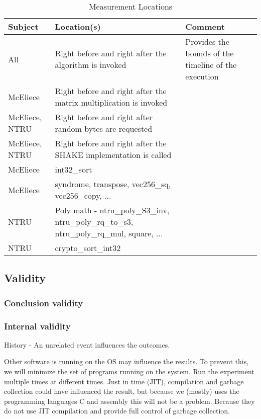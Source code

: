 \begin{table}[H]
    \centering
    \begin{tabular}{l|p{3cm}|p{3cm}}
        Subject & Location(s) & Comment \\
        \hline
        All & Right before and right after the algorithm is invoked & Provides the bounds of the timeline of the execution \\
        McEliece & Right before and right after the matrix multiplication is invoked & \\
        McEliece, NTRU & Right before and right after random bytes are requested & \\
        McEliece, NTRU & Right before and right after the SHAKE implementation is called & \\
        McEliece & int32_sort & \\
        McEliece & syndrome, transpose, vec256_sq, vec256_copy, ... &\\
        NTRU & Poly math - ntru_poly_S3_inv, ntru_poly_rq_to_s3, ntru_poly_rq_mul, square, ...& \\
        NTRU & crypto_sort_int32 & \\
    \end{tabular}
    \caption{Measurement Locations}
    \label{table:method:instrumentation}
\end{table}

\subsection{Validity}

\subsubsection{Conclusion validity}

\subsubsection{Internal validity}
\label{section:method:internal-validity}
History - An unrelated event influences the outcomes.

Other software is running on the OS may influence the results. To prevent this, we will minimize the set of programs running on the system. Run the experiment multiple times at different times.
Just in time (JIT), compilation and garbage collection could have influenced the result, but because we (mostly) uses the programming languages C and assembly this will not be a problem. Because they do not use JIT compilation and provide full control of garbage collection.

